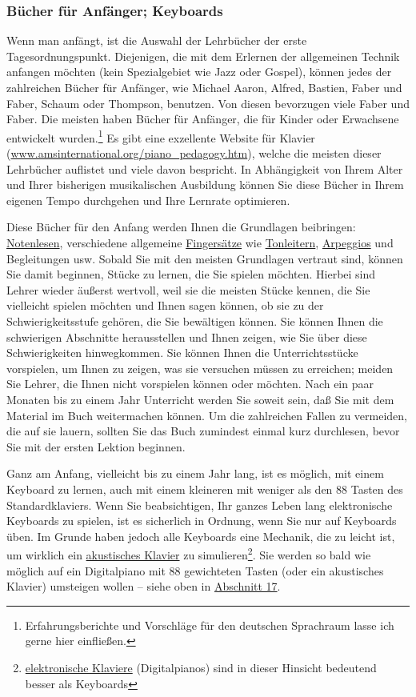 \subsubsection{Bücher für Anfänger; Keyboards}
\label{c1iii18b}

Wenn man anfängt, ist die Auswahl der Lehrbücher der erste Tagesordnungspunkt.
Diejenigen, die mit dem Erlernen der allgemeinen Technik anfangen möchten (kein Spezialgebiet wie Jazz oder Gospel), können jedes der zahlreichen Bücher für Anfänger, wie Michael Aaron, Alfred, Bastien, Faber und Faber, Schaum oder Thompson, benutzen.
Von diesen bevorzugen viele Faber und Faber.
Die meisten haben Bücher für Anfänger, die für Kinder oder Erwachsene entwickelt wurden.\footnote{Erfahrungsberichte und Vorschläge für den deutschen Sprachraum lasse ich gerne hier einfließen.}
Es gibt eine exzellente Website für Klavier (\url{www.amsinternational.org/piano_pedagogy.htm}), welche die meisten dieser Lehrbücher auflistet und viele davon bespricht.
In Abhängigkeit von Ihrem Alter und Ihrer bisherigen musikalischen Ausbildung können Sie diese Bücher in Ihrem eigenen Tempo durchgehen und Ihre Lernrate optimieren.

Diese Bücher für den Anfang werden Ihnen die Grundlagen beibringen: \hyperref[c1iii11]{Notenlesen}, verschiedene allgemeine \hyperref[c1ii18]{Fingersätze} wie \hyperref[c1iii5a]{Tonleitern}, \hyperref[Arpeggios]{Arpeggios} und Begleitungen usw.
Sobald Sie mit den meisten Grundlagen vertraut sind, können Sie damit beginnen, Stücke zu lernen, die Sie spielen möchten.
Hierbei sind Lehrer wieder äußerst wertvoll, weil sie die meisten Stücke kennen, die Sie vielleicht spielen möchten und 
Ihnen sagen können, ob sie zu der Schwierigkeitsstufe gehören, die Sie bewältigen können.
Sie können Ihnen die schwierigen Abschnitte herausstellen und Ihnen zeigen, wie Sie über diese Schwierigkeiten hinwegkommen.
Sie können Ihnen die Unterrichtsstücke vorspielen, um Ihnen zu zeigen, was sie versuchen müssen zu erreichen; meiden Sie Lehrer, die Ihnen nicht vorspielen können oder möchten.
Nach ein paar Monaten bis zu einem Jahr Unterricht werden Sie soweit sein, daß Sie mit dem Material im Buch weitermachen können.
Um die zahlreichen Fallen zu vermeiden, die auf sie lauern, sollten Sie das Buch zumindest einmal kurz durchlesen, bevor Sie mit der ersten Lektion beginnen.

Ganz am Anfang, vielleicht bis zu einem Jahr lang, ist es möglich, mit einem Keyboard zu lernen, auch mit einem kleineren mit weniger als den 88 Tasten des Standardklaviers.
Wenn Sie beabsichtigen, Ihr ganzes Leben lang elektronische Keyboards zu spielen, ist es sicherlich in Ordnung, wenn Sie nur auf Keyboards üben.
Im Grunde haben jedoch alle Keyboards eine Mechanik, die zu leicht ist, um wirklich ein \hyperref[c1iii17c]{akustisches Klavier} zu simulieren\footnote{\hyperref[c1iii17b]{elektronische Klaviere} (Digitalpianos) sind in dieser Hinsicht bedeutend besser als Keyboards}.
Sie werden so bald wie möglich auf ein Digitalpiano mit 88 gewichteten Tasten (oder ein akustisches Klavier) umsteigen wollen -- siehe oben in \hyperref[c1iii17]{Abschnitt 17}.


